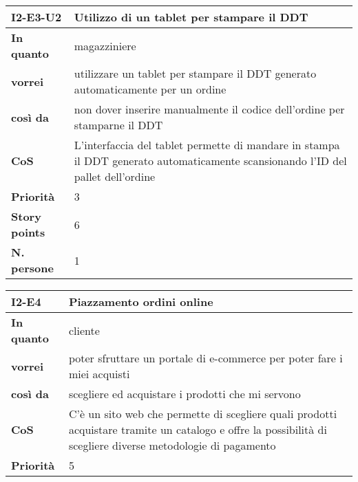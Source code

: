 \begin{table}[H]
  \begin{tabularx}{\textwidth}{lX}
    \toprule
    \textbf{I2-E3-U2} & \textbf{Utilizzo di un tablet per stampare il DDT} \\
    \midrule
    \textbf{In quanto} & magazziniere \\
    \textbf{vorrei} & utilizzare un tablet per stampare il DDT generato automaticamente per un ordine \\
    \textbf{così da} & non dover inserire manualmente il codice dell'ordine per stamparne il DDT \\
    \midrule
    \textbf{CoS} & L'interfaccia del tablet permette di mandare in stampa il DDT generato automaticamente scansionando l'ID del pallet dell'ordine \\
    \midrule
    \textbf{Priorità} & 3 \\
    \textbf{Story points} & 6 \\
    \textbf{N. persone} & 1 \\
    \bottomrule
  \end{tabularx}
  \label{user-story:i2-e3-u2}
\end{table}

\begin{table}[H]
  \begin{tabularx}{\textwidth}{lX}
    \toprule
    \textbf{I2-E4} & \textbf{Piazzamento ordini online} \\
    \midrule
    \textbf{In quanto} & cliente \\
    \textbf{vorrei} & poter sfruttare un portale di e-commerce per poter fare i miei acquisti \\
    \textbf{così da} & scegliere ed acquistare i prodotti che mi servono \\
    \midrule
    \textbf{CoS} & C'è un sito web che permette di scegliere quali prodotti acquistare tramite un catalogo e offre la possibilità di scegliere diverse metodologie di pagamento \\
    \midrule
    \textbf{Priorità} & 5 \\
    \bottomrule
  \end{tabularx}
  \label{user-story:i2-e4}
\end{table}

